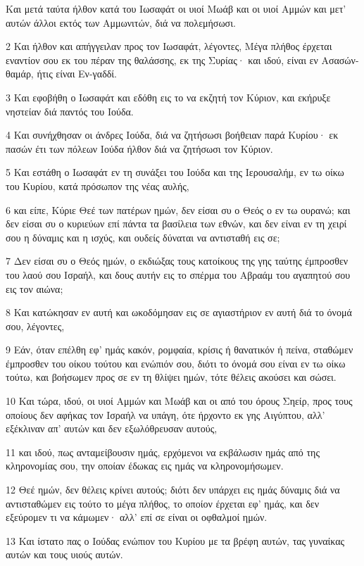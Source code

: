 \par Και μετά ταύτα ήλθον κατά του Ιωσαφάτ οι υιοί Μωάβ και οι υιοί Αμμών και μετ' αυτών άλλοι εκτός των Αμμωνιτών, διά να πολεμήσωσι.
\par 2 Και ήλθον και απήγγειλαν προς τον Ιωσαφάτ, λέγοντες, Μέγα πλήθος έρχεται εναντίον σου εκ του πέραν της θαλάσσης, εκ της Συρίας· και ιδού, είναι εν Ασασών-θαμάρ, ήτις είναι Εν-γαδδί.
\par 3 Και εφοβήθη ο Ιωσαφάτ και εδόθη εις το να εκζητή τον Κύριον, και εκήρυξε νηστείαν διά παντός του Ιούδα.
\par 4 Και συνήχθησαν οι άνδρες Ιούδα, διά να ζητήσωσι βοήθειαν παρά Κυρίου· εκ πασών έτι των πόλεων Ιούδα ήλθον διά να ζητήσωσι τον Κύριον.
\par 5 Και εστάθη ο Ιωσαφάτ εν τη συνάξει του Ιούδα και της Ιερουσαλήμ, εν τω οίκω του Κυρίου, κατά πρόσωπον της νέας αυλής,
\par 6 και είπε, Κύριε Θεέ των πατέρων ημών, δεν είσαι συ ο Θεός ο εν τω ουρανώ; και δεν είσαι συ ο κυριεύων επί πάντα τα βασίλεια των εθνών, και δεν είναι εν τη χειρί σου η δύναμις και η ισχύς, και ουδείς δύναται να αντισταθή εις σε;
\par 7 Δεν είσαι συ ο Θεός ημών, ο εκδιώξας τους κατοίκους της γης ταύτης έμπροσθεν του λαού σου Ισραήλ, και δους αυτήν εις το σπέρμα του Αβραάμ του αγαπητού σου εις τον αιώνα;
\par 8 Και κατώκησαν εν αυτή και ωκοδόμησαν εις σε αγιαστήριον εν αυτή διά το όνομά σου, λέγοντες,
\par 9 Εάν, όταν επέλθη εφ' ημάς κακόν, ρομφαία, κρίσις ή θανατικόν ή πείνα, σταθώμεν έμπροσθεν του οίκου τούτου και ενώπιόν σου, διότι το όνομά σου είναι εν τω οίκω τούτω, και βοήσωμεν προς σε εν τη θλίψει ημών, τότε θέλεις ακούσει και σώσει.
\par 10 Και τώρα, ιδού, οι υιοί Αμμών και Μωάβ και οι από του όρους Σηείρ, προς τους οποίους δεν αφήκας τον Ισραήλ να υπάγη, ότε ήρχοντο εκ γης Αιγύπτου, αλλ' εξέκλιναν απ' αυτών και δεν εξωλόθρευσαν αυτούς,
\par 11 και ιδού, πως ανταμείβουσιν ημάς, ερχόμενοι να εκβάλωσιν ημάς από της κληρονομίας σου, την οποίαν έδωκας εις ημάς να κληρονομήσωμεν.
\par 12 Θεέ ημών, δεν θέλεις κρίνει αυτούς; διότι δεν υπάρχει εις ημάς δύναμις διά να αντισταθώμεν εις τούτο το μέγα πλήθος, το οποίον έρχεται εφ' ημάς, και δεν εξεύρομεν τι να κάμωμεν· αλλ' επί σε είναι οι οφθαλμοί ημών.
\par 13 Και ίστατο πας ο Ιούδας ενώπιον του Κυρίου με τα βρέφη αυτών, τας γυναίκας αυτών και τους υιούς αυτών.
